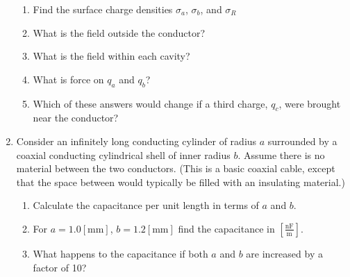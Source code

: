 \begin{enumerate}
    \begin{enumerate}

      \item Find the surface charge densities $\sigma_a$, $\sigma_b$, and $\sigma_R$

      \item What is the field outside the conductor?

      \item What is the field within each cavity?

      \item What is force on $q_a$ and $q_b$?

      \item Which of these answers would change if a third charge, $q_c$, were brought near the conductor?

    \end{enumerate}

  \item Consider an infinitely long conducting cylinder of radius $a$ surrounded by a coaxial conducting cylindrical shell of inner radius $b$. Assume there is no material between the two conductors.  (This is a basic coaxial cable, except that the space between would typically be filled with an insulating material.)

    \begin{enumerate}

      \item Calculate the capacitance per unit length in terms of $a$ and $b$.

      \item For $a=1.0[\si{\milli\meter}]$, $b=1.2[\si{\milli\meter}]$ find the capacitance in $\left[ \frac{\si{\nano\farad}}{\si{\meter}} \right]$.

      \item What happens to the capacitance if both $a$ and $b$ are increased by a factor of 10?

    \end{enumerate}

\end{enumerate}



